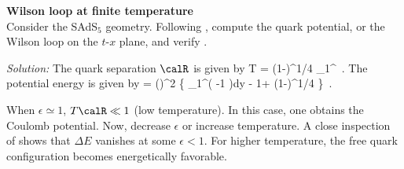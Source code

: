 \begin{prob}
\label{prob:wilson_debye}
\textbf{Wilson loop at finite temperature} 
\cite{Rey:1998bq2,Brandhuber:1998bs2}\\
Consider the SAdS$_5$ geometry. Following , compute the quark potential, or the Wilson loop on the $t$-$x$ plane, and verify .
\end{prob}

{\color{blue} 
\textit{Solution:}
The quark separation $\calR$ is given by
\be
%
T \calR
= (1-\epsilon)^{1/4}\sqrt{\epsilon}
\int_1^\infty {}~.
%
\ee
%
%
The potential energy is given by
\be
%
 = \left(\right)^2 
\left\{  
\int_1^\infty \left( -1 \right)dy - 1+ (1-\epsilon)^{1/4}
\right\}~.
\label{eq:potential_debye}
%
\ee
%
%

When $\epsilon \simeq 1$, $T\calR \ll 1$ (low temperature). In this case, one obtains the Coulomb potential. Now, decrease $\epsilon$ or increase temperature. A close inspection of  shows that $\Delta E$ vanishes at some $\epsilon<1$. For higher temperature, the free quark configuration becomes energetically favorable. 
}

